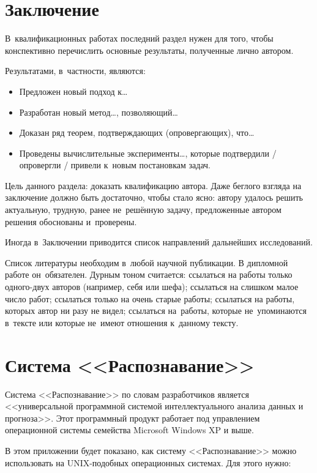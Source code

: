\documentclass[12pt,fleqn]{article}
\begin{document}
\section{Заключение}

В~квалификационных работах последний раздел нужен для того, чтобы
конспективно перечислить основные результаты, полученные лично
автором.

Результатами, в~частности, являются:
\begin{itemize}
\item
    Предложен новый подход к\dots
\item
    Разработан новый метод\dots, позволяющий\dots
\item
    Доказан ряд теорем, подтверждающих (опровергающих), что\dots
\item
    Проведены вычислительные эксперименты\dots, которые подтвердили /
    опровергли / привели к~новым постановкам задач.
\end{itemize}

Цель данного раздела: доказать квалификацию автора.  Даже беглого
взгляда на заключение должно быть достаточно, чтобы стало ясно: автору
удалось решить актуальную, трудную, ранее не~решённую задачу,
предложенные автором решения обоснованы и~проверены.

Иногда в~Заключении приводится список направлений дальнейших
исследований.

\newpage
Список литературы необходим в~любой научной публикации. В дипломной
работе он~обязателен. Дурным тоном считается: ссылаться на работы
только одного-двух авторов (например, себя или шефа); ссылаться на
слишком малое число работ; ссылаться только на очень старые работы;
ссылаться на работы, которых автор ни разу не видел; ссылаться
на~работы, которые не~упоминаются в~тексте или которые не~имеют
отношения к~данному тексту.

\appendix
\section{Система <<Распознавание>>}
Система <<Распознавание>> по словам разработчиков \cite{recognition06}
является <<универсальной программной системой интеллектуального
анализа данных и прогноза>>. Этот программный продукт работает под
управлением операционной системы семейства Microsoft Windows XP и
выше.

В этом приложении будет показано, как систему <<Распознавание>> можно
использовать на UNIX-подобных операционных системах. Для этого нужно:
\end{document}
